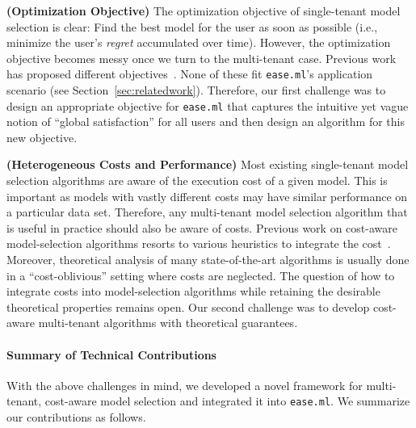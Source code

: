 \documentclass[letterpaper]{vldb}
\newcommand{\eml}{\texttt{ease.ml}\xspace}
\begin{document}
\noindent
{\bf (Optimization Objective)}
The optimization objective of single-tenant model selection is clear: Find the best model for the user as soon as 
possible (i.e., minimize the user's {\em regret} accumulated over time).
However, the optimization objective becomes messy once we turn to the multi-tenant case.
Previous work has proposed different objectives~\cite{XXX}.
None of these fit \eml's application scenario (see Section~\ref{sec:relatedwork}).
Therefore, our first challenge was to design an appropriate objective for \eml that captures the intuitive yet vague notion of ``global satisfaction'' for all users and then design 
an algorithm for this new objective.
 

\noindent
{\bf (Heterogeneous Costs and Performance)} Most
existing single-tenant model selection
 algorithms are aware of the execution cost of
  a given model. This is important as models with
  vastly different costs may have similar performance 
  on a particular data set. Therefore, any multi-tenant
  model selection algorithm that is useful in practice should also
  be aware of costs.
  Previous work on cost-aware model-selection algorithms resorts to various heuristics to integrate the cost~\cite{XXX}.
  Moreover, theoretical analysis of many state-of-the-art algorithms is usually done in a ``cost-oblivious'' setting where costs are neglected.
  The question of how to integrate costs into model-selection algorithms while retaining the desirable theoretical properties remains open.
  Our second challenge was to develop cost-aware multi-tenant algorithms with theoretical guarantees.
  
\vspace{-1em}
\paragraph*{Summary of Technical Contributions}


With the above challenges in mind, we developed a novel framework for multi-tenant, cost-aware model selection and integrated it into \eml. We summarize our contributions as follows.
\end{document}
